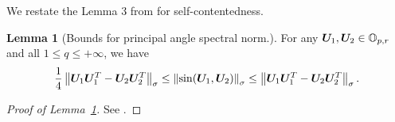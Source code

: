\documentclass[lettersize,onecolumn,journal]{IEEEtran}
\theoremstyle{definition}
\newtheorem{lem}{Lemma}
\theoremstyle{definition}
\newtheorem{conjecture}{Conjecture}
\newcommand{\of}[1]{\left(#1\right)}
\begin{document}



We restate the Lemma 3 from \cite{zhang2018tensor} for self-contentedness. 
\begin{lem}[Bounds for principal angle spectral norm.]\label{lem:equivalence_qnorm}
    For any $\bm{U}_1, \bm{U}_2 \in \mathbb{O}_{p,r}$ and all $1 \leq q \leq +\infty$, we have
    \begin{align}
        \frac{1}{4} \left\lVert\bm{U}_1 \bm{U}_1^T - \bm{U}_2 \bm{U}_2^T\right\rVert_{\sigma} \leq \left\lVert\sin(\bm{U}_1, \bm{U}_2) \right\rVert_{\sigma} \leq  \left\lVert\bm{U}_1 \bm{U}_1^T - \bm{U}_2 \bm{U}_2^T\right\rVert_{\sigma}.
    \end{align}
\end{lem}

\begin{proof}[Proof of Lemma~\ref{lem:equivalence_qnorm}] See \citet[Proof of Lemma 3]{zhang2018tensor}.
\end{proof}
\end{document}

